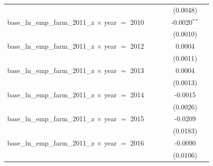 \begin{tabular}{lccccc}
                                                                &                    &                 &                       & (0.0048)                   &   \\   
   base\_ln\_emp\_farm\_2011\_z $\times$ year $=$ 2010          &                    &                 &                       & -0.0020$^{**}$             &   \\   
                                                                &                    &                 &                       & (0.0010)                   &   \\   
   base\_ln\_emp\_farm\_2011\_z $\times$ year $=$ 2012          &                    &                 &                       & 0.0004                     &   \\   
                                                                &                    &                 &                       & (0.0011)                   &   \\   
   base\_ln\_emp\_farm\_2011\_z $\times$ year $=$ 2013          &                    &                 &                       & 0.0004                     &   \\   
                                                                &                    &                 &                       & (0.0013)                   &   \\   
   base\_ln\_emp\_farm\_2011\_z $\times$ year $=$ 2014          &                    &                 &                       & -0.0015                    &   \\   
                                                                &                    &                 &                       & (0.0026)                   &   \\   
   base\_ln\_emp\_farm\_2011\_z $\times$ year $=$ 2015          &                    &                 &                       & -0.0209                    &   \\   
                                                                &                    &                 &                       & (0.0183)                   &   \\   
   base\_ln\_emp\_farm\_2011\_z $\times$ year $=$ 2016          &                    &                 &                       & -0.0090                    &   \\   
                                                                &                    &                 &                       & (0.0106)                   &   \\   

\end{tabular}
